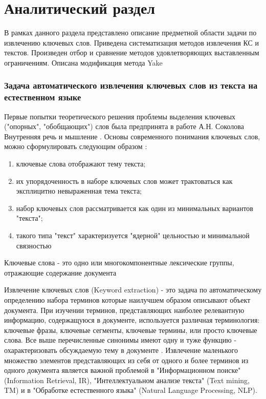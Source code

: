 \chapter{Аналитический раздел}
В рамках данного раздела представлено описание предметной области задачи по извлечению ключевых слов. Приведена систематизация методов извлечения КС и текстов.
Произведен отбор и сравнение методов удовлетворяющих выставленным ограничениям.
Описана модификация метода Yake

\subsection{Задача автоматического извлечения ключевых слов из текста на естественном языке}

Первые попытки теоретического решения проблемы выделения ключевых ("опорных", "обобщающих") слов была предпринята в работе А.Н. Соколова Внутренняя речь и мышление \cite{6}.
Основы современного понимания ключевых слов, можно сформулировать следующим образом \cite{7}:
\begin{enumerate}
	\item ключевые слова отображают тему текста;
	\item их упорядоченность в наборе ключевых слов может трактоваться как эксплицитно невыраженная тема текста;
	\item набор ключевых слов рассматривается как один из минимальных вариантов "текста";
	\item такого типа "текст" характеризуется "ядерной" цельностью и минимальной связностью
\end{enumerate}

Ключевые слова - это одно или многокомпонентные лексические группы, отражающие содержание документа \cite{3}

Извлечение ключевых слов (Keyword extraction) - это задача по автоматическому определению набора терминов которые наилучшем образом описывают объект документа.
При изучении терминов, представляющих наиболее релевантную информацию, содержащуюся в документе, используется различная терминология: ключевые фразы, ключевые сегменты, ключевые термины, или просто ключевые слова.
Все выше перечисленные синонимы имеют одну и туже функцию - охарактеризовать обсуждаемую тему в документе \cite{4}.
Извлечение маленького множество элементов представляющих из себя от одного и более терминов из одного документа является важной проблемой в "Информационном поиске" (Information Retrieval, IR), "Интеллектуальном анализе текста" (Text mining, TM) и в "Обработке естественного языка" (Natural Language Processing, NLP).

